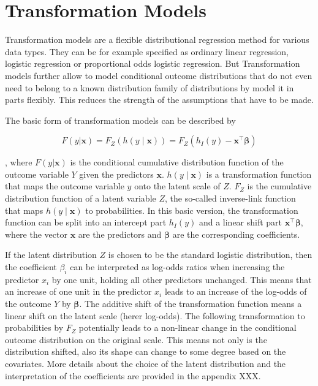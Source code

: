 \section{Transformation Models}


Transformation models are a flexible distributional regression method for various data types. They can be for example specified as ordinary linear regression, logistic regression or proportional odds logistic regression. But Transformation models further allow to model conditional outcome distributions that do not even need to belong to a known distribution family of distributions by model it in parts flexibly. This reduces the strength of the assumptions that have to be made.

The basic form of transformation models can be described by

\begin{equation}
F(y|\mathbf{x}) = F_Z(h(y \mid \mathbf{x})) =  F_Z(h_I(y) - \mathbf{x}^\top \boldsymbol{\beta})
\label{eq:transformation_model}
\end{equation}

, where $F(y|\mathbf{x})$ is the conditional cumulative distribution function of the outcome variable $Y$ given the predictors $\mathbf{x}$. $h(y \mid \mathbf{x})$ is a transformation function that maps the outcome variable $y$ onto the latent scale of $Z$. $F_Z$ is the cumulative distribution function of a latent variable $Z$, the so-called inverse-link function that maps $h(y \mid \mathbf{x})$ to probabilities. In this basic version, the transformation function can be split into an intercept part $h_I(y)$ and a linear shift part $\mathbf{x}^\top \boldsymbol{\beta}$, where the vector $\mathbf{x}$ are the predictors and $\boldsymbol{\beta}$ are the corresponding coefficients.

If the latent distribution $Z$ is chosen to be the standard logistic distribution, then the coefficient $\beta_i$ can be interpreted as log-odds ratios when increasing the predictor $x_i$ by one unit, holding all other predictors unchanged. This means that an increase of one unit in the predictor $x_i$ leads to an increase of the log-odds of the outcome $Y$ by $\boldsymbol{\beta}$. The additive shift of the transformation function means a linear shift on the latent scale (herer log-odds). The following transformation to probabilities by $F_Z$ potentially leads to a non-linear change in the conditional outcome distribution on the original scale. This means not only is the distribution shifted, also its shape can change to some degree based on the covariates. More details about the choice of the latent distribution and the interpretation of the coefficients are provided in the appendix XXX.


